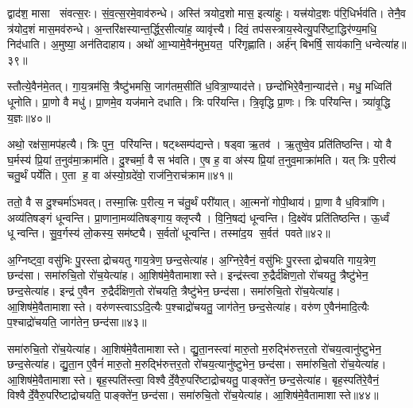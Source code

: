 द्वाद॑श॒ मासा संवत्स॒रः। सं॒व॒त्स॒रमे॒वाव॑रुन्धे। अस्ति॑ त्रयोद॒शो मास॒ इत्या॑हुः। यत्त्र॑योद॒शः प॑रि॒धिर्भव॑ति। तेनै॒व त्र॑योद॒शं मास॒मव॑रुन्धे। अ॒न्तरि॑क्षस्यान्त॒र्द्धिर॒सीत्या॑ह॒ व्यावृ॑त्त्यै। दिवं॒ तप॑सस्त्राय॒स्वेत्यु॒परि॑ष्टा॒द्धिर॑ण्य॒मधि॒ निद॑धाति। अ॒मुष्या॒ अन॑तिदाहाय। अथो॑ आ॒भ्यामे॒वैन॑मुभ॒यत॒ परि॑गृह्णाति। अर्\mbox{}ह॑न् बिभर्\mbox{}षि॒ साय॑कानि॒ धन्वेत्या॑ह॥३९॥

स्तौत्ये॒वैन॑मे॒तत्। गा॒य॒त्रम॑सि॒ त्रैष्टु॑भमसि॒ जाग॑तम॒सीति॑ ध॒वित्रा॒ण्याद॑त्ते। छन्दो॑भिरे॒वैना॒न्याद॑त्ते। मधु॒ मध्विति॑ धूनोति। प्रा॒णो वै मधु॑। प्रा॒णमे॒व यज॑माने दधाति। त्रिः परि॑यन्ति। त्रि॒वृद्धि प्रा॒णः। त्रिः परि॑यन्ति। त्र्या॑वृ॒द्धि य॒ज्ञः॥४०॥

अथो॒ रक्ष॑सा॒मप॑हत्यै। त्रिः पुन॒ परि॑यन्ति। षट्थ्सम्प॑द्यन्ते। षड्वा ऋ॒तव॑। ऋ॒तुष्वे॒व प्रति॑तिष्ठन्ति। यो वै घ॒र्मस्य॑ प्रि॒यां त॒नुव॑मा॒क्राम॑ति। दु॒श्चर्मा॒ वै स भ॑वति। ए॒ष ह॒ वा अ॑स्य प्रि॒यां त॒नुव॒माक्रा॑मति। यत् त्रिः प॒रीत्य॑ चतु॒र्थं पर्ये॑ति। ए॒ता ह॒ वा अ॑स्यो॒ग्रदे॑वो॒ राज॑नि॒राच॑क्राम॥४१॥

ततो॒ वै स दु॒श्चर्मा॑ऽभवत्। तस्मा॒त्त्रिः प॒रीत्य॒ न च॑तु॒र्थं परी॑यात्। आ॒त्मनो॑ गोपी॒थाय॑। प्रा॒णा वै ध॒वित्रा॑णि। अव्य॑तिषङ्गं धून्वन्ति। प्रा॒णाना॒मव्य॑तिषङ्गाय॒ क्लृप्त्यै। वि॒नि॒षद्य॑ धून्वन्ति। दि॒क्ष्वे॑व प्रति॑तिष्ठन्ति। ऊ॒र्ध्वं धून्वन्ति। सु॒व॒र्गस्य॑ लो॒कस्य॒ सम॑ष्ट्यै। स॒र्वतो॑ धून्वन्ति। तस्मा॑द॒य स॒र्वत॑ पवते॥४२॥
\anuvakamend[द॒धा॒ती॒वान्वा॑ह य॒ज्ञस्या॑है॒ष उ॒परि॑ष्टादाशीर॒न्यो व्यास्था॒पय॑न्ति र॒श्मयो॑ भवन्ति॒ धन्वेत्या॑ह य॒ज्ञश्च॑क्राम॒ सम॑ष्ट्यै॒ द्वे च॑]

अ॒ग्निष्ट्वा॒ वसु॑भिः पु॒रस्ताद्रोचयतु गाय॒त्रेण॒ छन्द॒सेत्या॑ह। अ॒ग्निरे॒वैनं॒ वसु॑भिः पु॒रस्ताद्रोचयति गाय॒त्रेण॒ छन्द॑सा। समा॑रुचि॒तो रो॑च॒येत्या॑ह। आ॒शिष॑मे॒वैतामाशास्ते। इन्द्र॑स्त्वा रु॒द्रैर्द॑क्षिण॒तो रो॑चयतु॒ त्रैष्टु॑भेन॒ छन्द॒सेत्या॑ह। इन्द्र॑ ए॒वैन रु॒द्रैर्द॑क्षिण॒तो रो॑चयति॒ त्रैष्टु॑भेन॒ छन्द॑सा। समा॑रुचि॒तो रो॑च॒येत्या॑ह। आ॒शिष॑मे॒वैतामाशास्ते। वरु॑णस्त्वाऽऽदि॒त्यैः प॒श्चाद्रो॑चयतु॒ जाग॑तेन॒ छन्द॒सेत्या॑ह। वरु॑ण ए॒वैन॑मादि॒त्यैः प॒श्चाद्रो॑चयति॒ जाग॑तेन॒ छन्द॑सा॥४३॥

समा॑रुचि॒तो रो॑च॒येत्या॑ह। आ॒शिष॑मे॒वैतामाशास्ते। द्यु॒ता॒नस्त्वा॑ मारु॒तो म॒रुद्भि॑रुत्तर॒तो रो॑चय॒त्वानु॑ष्टुभेन॒ छन्द॒सेत्या॑ह। द्यु॒ता॒न ए॒वैनं॑ मारु॒तो म॒रुद्भि॑रुत्तर॒तो रो॑चय॒त्यानु॑ष्टुभेन॒ छन्द॑सा। समा॑रुचि॒तो रो॑च॒येत्या॑ह। आ॒शिष॑\-मे॒वैतामाशास्ते। बृह॒स्पति॑स्त्वा॒ विश्वैर्दे॒वैरु॒परि॑ष्टा\-द्रोचयतु॒ पाङ्क्ते॑न॒ छन्द॒सेत्या॑ह। बृह॒स्पति॑रे॒वैनं॒  विश्वैर्दे॒वै\-रु॒परि॑ष्टाद्रोचयति॒ पाङ्क्ते॑न॒ छन्द॑सा। समा॑रुचि॒तो रो॑च॒येत्या॑ह। आ॒शिष॑मे॒वैतामाशास्ते॥४४॥

